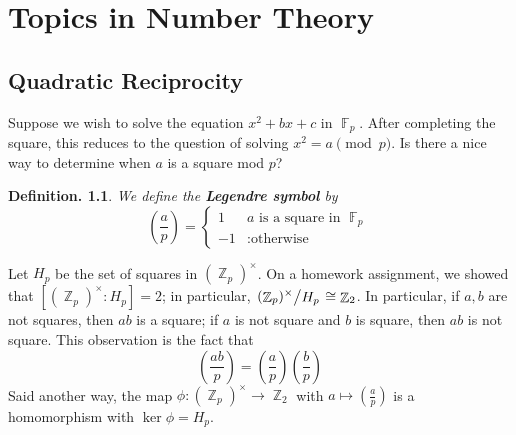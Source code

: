 \documentclass[11pt, a4paper]{memoir}
\DeclareMathOperator{\Z}{{\mathbb{Z}}}
\DeclareMathOperator{\F}{{\mathbb{F}}}
\theoremstyle{change}
\theoremstyle{plain}
\theoremstyle{nonumberplain}
\newtheorem{definition}{Definition.}
\newcommand{\lgs}[2]{\ensuremath{\left(\frac{#1}{#2}\right)}}
\newcommand{\quot}[2]{\mathchoice{\left.\raisebox{0.07em}{$#1$}\middle/\raisebox{-0.07em}{$#2$}\right.}
                                 {\left.\raisebox{0.03em}{$#1$}\middle/\raisebox{-0.03em}{$#2$}\right.}
                                 {\left.\raisebox{0.00em}{$#1$}\middle/\raisebox{-0.00em}{$#2$}\right.}
                                 {\left.\raisebox{0em}{$#1$}\middle/\raisebox{0em}{$#2$}\right.}}
\newcommand{\mbf}[1]{{\boldmath\bfseries #1}}
\numberwithin{equation}{section}
\begin{document}
\chapter{Topics in Number Theory}
\section{Quadratic Reciprocity}
Suppose we wish to solve the equation $x^2+bx+c$ in $\F_p$.
After completing the square, this reduces to the question of solving $x^2=a\pmod{p}$.
Is there a nice way to determine when $a$ is a square mod $p$?
\begin{definition}
    We define the \mbf{Legendre symbol} by
    \begin{equation*}
        \lgs{a}{p}=\begin{cases}1&\text{$a$ is a square in $\F_p$}\\-1&:\text{otherwise}\end{cases}
    \end{equation*}
\end{definition}
Let $H_p$ be the set of squares in $(\Z_p)^\times$.
On a homework assignment, we showed that $[(\Z_p)^\times:H_p]=2$; in particular, $\quot{(\Z_p)^\times}{H_p}\cong\Z_2$.
In particular, if $a,b$ are not squares, then $ab$ is a square; if $a$ is not square and $b$ is square, then $ab$ is not square.
This observation is the fact that
\begin{equation*}
    \lgs{ab}{p}=\lgs{a}{p}\lgs{b}{p}
\end{equation*}
Said another way, the map $\phi:(\Z_p)^\times\to\Z_2$ with $a\mapsto\lgs{a}{p}$ is a homomorphism with $\ker\phi=H_p$.
\end{document}
